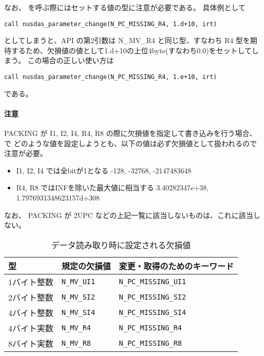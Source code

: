なお、 を呼ぶ際にはセットする値の型に注意が必要である。
具体例として
\begin{verbatim}
call nusdas_parameter_change(N_PC_MISSING_R4, 1.d+10, irt)
\end{verbatim}
としてしまうと、API  の第2引数は N\_MV\_R4 と同じ型、すなわち R4 型を期待するため、欠損値の値として1.d+10の上位4byte(すなわち0.0)をセットしてしまう。
この場合の正しい使い方は
\begin{verbatim}
call nusdas_parameter_change(N_PC_MISSING_R4, 1.e+10, irt)
\end{verbatim}
である。

\paragraph{注意}
PACKING が I1, I2, I4, R4, R8 の際に欠損値を指定して書き込みを行う場合、
で
どのような値を設定しようとも、以下の値は必ず欠損値として扱われるので注意が必要。
\begin{itemize}
\item I1, I2, I4 では全bitが1となる -128, -32768, -2147483648
\item R4, R8 ではINFを除いた最大値に相当する 3.40282347e+38, 1.7976931348623157d+308
\end{itemize}
なお、 PACKING が 2UPC などの上記一覧に該当しないものは、これに該当しない。


\begin{table}
\begin{center}
\begin{tabular}{l|ll}
\hline 
型 & 規定の欠損値 & 変更・取得のためのキーワード \\
\hline
1バイト整数 & {\tt N\_MV\_UI1} & {\tt N\_PC\_MISSING\_UI1} \\
2バイト整数 & {\tt N\_MV\_SI2} & {\tt N\_PC\_MISSING\_SI2} \\
4バイト整数 & {\tt N\_MV\_SI4} & {\tt N\_PC\_MISSING\_SI4} \\
4バイト実数 & {\tt N\_MV\_R4} & {\tt N\_PC\_MISSING\_R4} \\
8バイト実数 & {\tt N\_MV\_R8} & {\tt N\_PC\_MISSING\_R8} \\
\hline
\end{tabular}
\caption{データ読み取り時に設定される欠損値}
\label{tab:rmisval}
\end{center}
\end{table}
